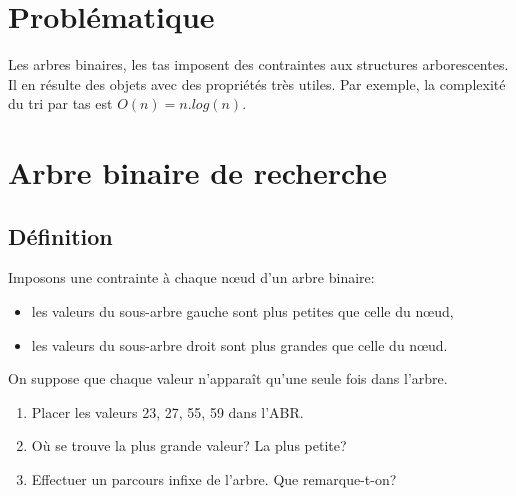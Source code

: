 \documentclass[a4paper,11pt]{article}
\begin{document}
\begin{Form}
\section{Problématique}
Les arbres binaires, les tas imposent des contraintes aux structures arborescentes. Il en résulte des objets avec des propriétés très utiles. Par exemple, la complexité du tri par tas est $O(n) = n.log(n)$.
\begin{center}
\end{center}
\section{Arbre binaire de recherche}
\subsection{Définition}
Imposons une contrainte à chaque nœud d'un arbre binaire:
\begin{itemize}
\item les valeurs du sous-arbre gauche sont plus petites que celle du nœud,
\item les valeurs du sous-arbre droit sont plus grandes que celle du nœud.
\end{itemize}
\begin{center}
\begin{aretenir}[Remarque]
On suppose que chaque valeur n'apparaît qu'une seule fois dans l'arbre.
\end{aretenir}
\label{arbre}
\end{center}
\begin{activite}
\begin{enumerate}
\item Placer les valeurs 23, 27, 55, 59 dans l'ABR.
\item Où se trouve la plus grande valeur? La plus petite?
\item Effectuer un parcours infixe de l'arbre. Que remarque-t-on?
\end{enumerate}
\end{activite}

\end{Form}
\end{document}
